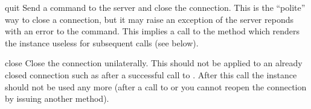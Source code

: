\begin{methoddesc}[FTP]{quit}{}
Send a  command to the server and close the connection.
This is the ``polite'' way to close a connection, but it may raise an
exception of the server reponds with an error to the
 command.  This implies a call to the 
method which renders the  instance useless for subsequent
calls (see below).
\end{methoddesc}

\begin{methoddesc}[FTP]{close}{}
Close the connection unilaterally.  This should not be applied to an
already closed connection such as after a successful call to
.  After this call the  instance should not
be used any more (after a call to  or
 you cannot reopen the connection by issuing another
 method).
\end{methoddesc}
